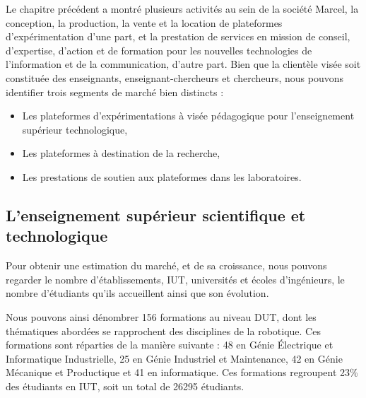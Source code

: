 \documentclass[a4paper,12pt]{report}
\begin{document}

Le chapitre précédent a montré plusieurs activités au sein de la société Marcel, la conception, la production, la vente et la location de plateformes d’expérimentation d'une part,
et la prestation de services en mission de conseil, d’expertise, d’action et de formation pour les nouvelles technologies de l’information et de la communication, d'autre part.
Bien que la clientèle visée soit constituée des enseignants, enseignant-chercheurs et chercheurs, nous pouvons identifier trois segments de marché bien distincts :
\begin{itemize}
	\item Les plateformes d'expérimentations à visée pédagogique pour l'enseignement supérieur technologique,
	\item Les plateformes à destination de la recherche,
	\item Les prestations de soutien aux plateformes dans les laboratoires.
\end{itemize}

\subsection{L'enseignement supérieur scientifique et technologique}
Pour obtenir une estimation du marché, et de sa croissance, nous pouvons regarder le nombre d'établissements, IUT, universités et écoles d'ingénieurs, 
le nombre d'étudiants qu'ils accueillent ainsi que son évolution.

Nous pouvons ainsi dénombrer 156 formations au niveau DUT, dont les thématiques abordées se rapprochent des disciplines de la robotique.
Ces formations sont réparties de la manière suivante : 48 en Génie Électrique et Informatique Industrielle, 25 en Génie Industriel et Maintenance, 
42 en Génie Mécanique et Productique et 41 en informatique.
Ces formations regroupent 23\% des étudiants en IUT, soit un total de 26295 étudiants.
\end{document}
